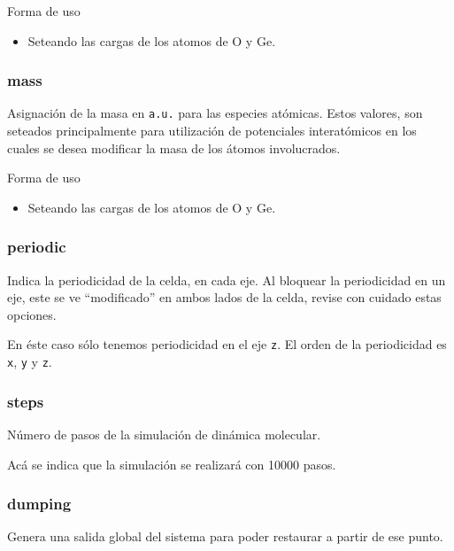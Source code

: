 Forma de uso

\begin{itemize}
 \item Seteando las cargas de los atomos de O y Ge.
\end{itemize}

\subsubsection{mass}
Asignaci\'on de la masa en \verb|a.u.| para las especies at\'omicas. Estos valores, son seteados principalmente para utilizaci\'on de potenciales interat\'omicos en los cuales se desea modificar la masa de los \'atomos involucrados.


Forma de uso

\begin{itemize}
 \item Seteando las cargas de los atomos de O y Ge.
\end{itemize}


\subsubsection{periodic}
Indica la periodicidad de la celda, en cada eje. Al bloquear la periodicidad en un eje, este se ve ``modificado'' en ambos lados de la celda, revise con cuidado estas opciones.


En \'este caso s\'olo tenemos periodicidad en el eje \verb|z|. El orden de la periodicidad es \verb|x|, \verb|y| y \verb|z|.

\subsubsection{steps}
N\'umero de pasos de la simulaci\'on de din\'amica molecular.


Ac\'a se indica que la simulaci\'on se realizar\'a con 10000 pasos.

\subsubsection{dumping}
Genera una salida global del sistema para poder restaurar a partir de ese punto.

